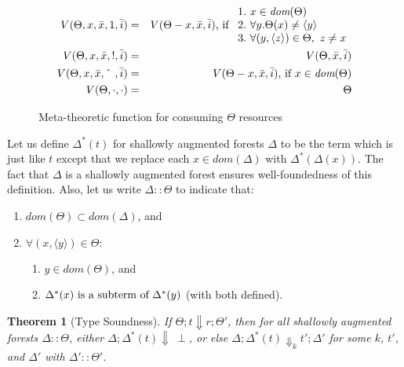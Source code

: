 \documentclass[9pt,natbib]{sigplanconf}
\newtheorem{theorem}{Theorem}
\begin{document}
\begin{figure}
\begin{eqnarray*}
V(\Theta,x,\bar{x},1,\bar{i}) & = & V(\Theta - x ,\bar{x},\bar{i})\textnormal{, if }
\begin{array}{l}
1.\  x\in\textit{dom}(\Theta) \\ 
2.\  \forall y. \Theta(x) \neq \langle y \rangle \\ 
3.\  \forall (y,\langle z \rangle)\in\Theta,\ z\neq x \\
\end{array} \\
V(\Theta,x,\bar{x},!,\bar{i}) & = & V(\Theta ,\bar{x},\bar{i}) \\
V(\Theta,x,\bar{x},\textnormal{\^{\ }},\bar{i}) & = & V(\Theta - x ,\bar{x},\bar{i})\textnormal{, if }x\in\textit{dom}(\Theta)\\
V(\Theta,\cdot,\cdot) & = & \Theta
\end{eqnarray*}
\caption{Meta-theoretic function for consuming $\Theta$ resources}
\label{fig:consumea}
\end{figure}

\noindent Let us define $\Delta^*(t)$ for shallowly augmented forests
$\Delta$ to be the term which is just like $t$ except that we replace
each $x\in\textit{dom}(\Delta)$ with $\Delta^*(\Delta(x))$.  The fact
that $\Delta$ is a shallowly augmented forest ensures well-foundedness
of this definition.  Also, let us write $\Delta::\Theta$ to indicate
that:
\begin{enumerate}
\item $\textit{dom}(\Theta)\subset\textit{dom}(\Delta)$, and
\item $\forall (x,\langle y \rangle)\in\Theta:$
\begin{enumerate}
\item $y\in\textit{dom}(\Theta)$, and
\item $\Delta^*(x)\textnormal{ is a subterm of }\Delta^*(y)$ (with both defined).
\end{enumerate}
\end{enumerate}

\begin{theorem}[Type Soundness]
If $\Theta; t \Downarrow r; \Theta'$, then for all shallowly augmented
forests $\Delta::\Theta$, either $\Delta; \Delta^*(t) \Downarrow\ 
\perp$, or else $\Delta; \Delta^*(t)\Downarrow_k t'; \Delta'$ for some
$k$, $t'$, and $\Delta'$ with $\Delta'::\Theta'$.
\end{theorem}
\end{document}
